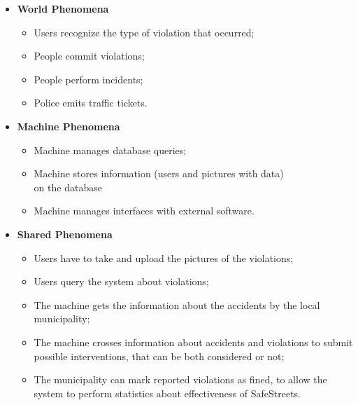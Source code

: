 \documentclass[../RASD.tex]{subfiles}
\begin{document}
    \begin{itemize}
        \item \textbf{World Phenomena}
        \begin{itemize}
            \item Users recognize the type of violation that occurred;
            \item People commit violations;
            \item People perform incidents;
            \item Police emits traffic tickets.
        \end{itemize}
        \item \textbf{Machine Phenomena}
        \begin{itemize}
            \item Machine manages database queries;
            \item Machine stores information (users and pictures with data)
            \\ on the database
            \item Machine manages interfaces with external software.
        \end{itemize}
        \item \textbf{Shared Phenomena}
        \begin{itemize}
            \item Users have to take and upload the pictures of the violations;
            \item Users query the system about violations;
            \item The machine gets the information about the accidents by the local municipality;
            \item The machine crosses information about accidents and violations to submit possible interventions, that can be both considered or not;
            \item The municipality can mark reported violations as fined, to allow the system to perform statistics about effectiveness of SafeStreets.
        \end{itemize}
    \end{itemize}
\end{document}
